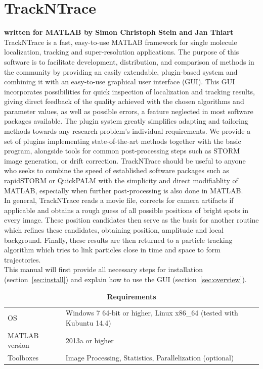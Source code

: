 \documentclass[11pt,onside]{report}
\numberwithin{equation}{chapter}
\begin{document}
\chapter*{TrackNTrace}
\vspace*{-30pt}\textbf{written for MATLAB by Simon Christoph Stein and Jan Thiart}\\ [20pt]
TrackNTrace is a fast, easy-to-use MATLAB framework for single molecule localization, tracking and super-resolution applications. The purpose of this software is to facilitate development, distribution, and comparison of methods in the community by providing an easily extendable, plugin-based system and combining it with an easy-to-use graphical user interface (GUI). This GUI incorporates possibilities for quick inspection of localization and tracking results, giving direct feedback of the quality achieved with the chosen algorithms and parameter values, as well as possible errors, a feature neglected in most software packages available. The plugin system greatly simplifies adapting and tailoring methods towards any research problem's individual requirements. We provide a set of plugins implementing state-of-the-art methods together with the basic program, alongside tools for common post-processing steps such as STORM image generation, or drift correction. TrackNTrace should be useful to anyone who seeks to combine the speed of established software packages such as rapidSTORM or QuickPALM with the simplicity and direct modifiablity of MATLAB, especially when further post-processing is also done in MATLAB.\\
  
In general, TrackNTrace reads a movie file, corrects for camera artifacts if applicable and obtains a rough guess of all possible positions of bright spots in every image. These position candidates then serve as the basis for another routine which refines these candidates, obtaining position, amplitude and local background. Finally, these results are then returned to a particle tracking algorithm which tries to link particles close in time and space to form trajectories.\\[10pt]
This manual will first provide all necessary steps for installation (section~\ref{sec:install}) and explain how to use the GUI (section~\ref{sec:overview}). 
\begin{table}[!h]
\centering
\caption*{\textbf{Requirements}}
\label{tab:requirements}
\begin{tabular}{p{} p{}}
\toprule
OS & Windows 7 64-bit or higher, Linux x86\_64 (tested with Kubuntu 14.4) \\[5pt]
MATLAB version & 2013a or higher\\[5pt]
Toolboxes & Image Processing, Statistics, Parallelization (optional) \\[0pt]
\bottomrule
\end{tabular}
\end{table}
\end{document}
